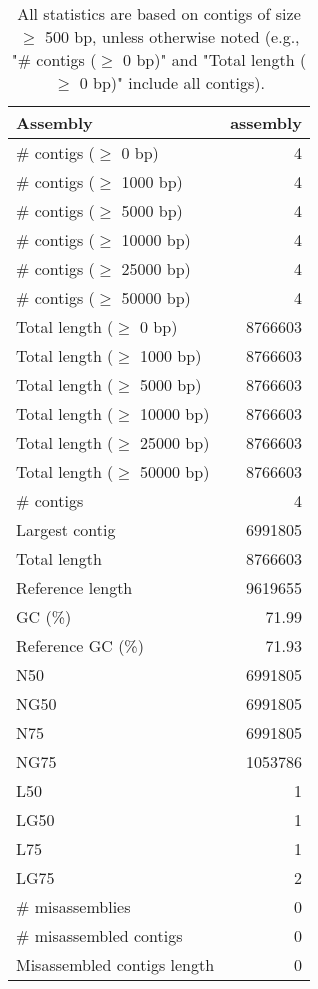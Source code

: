 \documentclass[12pt,a4paper]{article}
\begin{document}
\begin{table}[ht]
\begin{center}
\caption{All statistics are based on contigs of size $\geq$ 500 bp, unless otherwise noted (e.g., "\# contigs ($\geq$ 0 bp)" and "Total length ($\geq$ 0 bp)" include all contigs).}
\begin{tabular}{|l*{1}{|r}|}
\hline
Assembly & assembly \\ \hline
\# contigs ($\geq$ 0 bp) & 4 \\ \hline
\# contigs ($\geq$ 1000 bp) & 4 \\ \hline
\# contigs ($\geq$ 5000 bp) & 4 \\ \hline
\# contigs ($\geq$ 10000 bp) & 4 \\ \hline
\# contigs ($\geq$ 25000 bp) & 4 \\ \hline
\# contigs ($\geq$ 50000 bp) & 4 \\ \hline
Total length ($\geq$ 0 bp) & 8766603 \\ \hline
Total length ($\geq$ 1000 bp) & 8766603 \\ \hline
Total length ($\geq$ 5000 bp) & 8766603 \\ \hline
Total length ($\geq$ 10000 bp) & 8766603 \\ \hline
Total length ($\geq$ 25000 bp) & 8766603 \\ \hline
Total length ($\geq$ 50000 bp) & 8766603 \\ \hline
\# contigs & 4 \\ \hline
Largest contig & 6991805 \\ \hline
Total length & 8766603 \\ \hline
Reference length & 9619655 \\ \hline
GC (\%) & 71.99 \\ \hline
Reference GC (\%) & 71.93 \\ \hline
N50 & 6991805 \\ \hline
NG50 & 6991805 \\ \hline
N75 & 6991805 \\ \hline
NG75 & 1053786 \\ \hline
L50 & 1 \\ \hline
LG50 & 1 \\ \hline
L75 & 1 \\ \hline
LG75 & 2 \\ \hline
\# misassemblies & 0 \\ \hline
\# misassembled contigs & 0 \\ \hline
Misassembled contigs length & 0 \\ \hline

\end{tabular}
\end{center}
\end{table}
\end{document}
